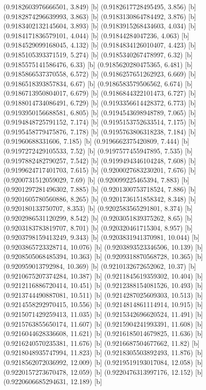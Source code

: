 {{{(0.9182603976666501, 3.849) [b] 
(0.9182617728495495, 3.856) [b] 
(0.9182874296639993, 3.863) [b] 
(0.9183130864784492, 3.876) [b] 
(0.9183402132145604, 3.893) [b] 
(0.9183915268434603, 4.034) [b] 
(0.9184171836579101, 4.044) [b] 
(0.91844284047236, 4.063) [b] 
(0.9184529099168045, 4.132) [b] 
(0.9184834126010407, 4.423) [b] 
(0.9185105393371519, 5.274) [b] 
(0.9185340267478997, 6.32) [b] 
(0.9185575141586476, 6.33) [b] 
(0.9185620280475365, 6.481) [b] 
(0.9185866537370558, 6.572) [b] 
(0.9186257651262923, 6.669) [b] 
(0.9186518393857834, 6.67) [b] 
(0.9186583579506562, 6.674) [b] 
(0.9186713950804017, 6.679) [b] 
(0.9186844322101473, 6.727) [b] 
(0.9188014734086491, 6.729) [b] 
(0.9193356614428372, 6.773) [b] 
(0.9193950156688581, 6.805) [b] 
(0.9194543698948789, 7.065) [b] 
(0.9194848725791152, 7.174) [b] 
(0.9195153752633514, 7.175) [b] 
(0.9195458779475876, 7.178) [b] 
(0.9195763806318238, 7.184) [b] 
(0.91960688331606, 7.185) [b] 
(0.9196662375420809, 7.444) [b] 
(0.9197272429105533, 7.52) [b] 
(0.9197577455947895, 7.535) [b] 
(0.9197882482790257, 7.542) [b] 
(0.9199494346104248, 7.608) [b] 
(0.9199624717401703, 7.615) [b] 
(0.9200027683230201, 7.676) [b] 
(0.9200731512059029, 7.69) [b] 
(0.920099225465394, 7.883) [b] 
(0.9201297281496302, 7.885) [b] 
(0.9201300753718524, 7.886) [b] 
(0.9201605780560886, 8.265) [b] 
(0.9201736151858342, 8.348) [b] 
(0.920180133750707, 8.353) [b] 
(0.9202583565291801, 8.374) [b] 
(0.9202986531120299, 8.542) [b] 
(0.9203051839375262, 8.65) [b] 
(0.9203183783819707, 8.701) [b] 
(0.920320461715304, 8.957) [b] 
(0.9203798159413249, 9.343) [b] 
(0.9203831941370981, 10.044) [b] 
(0.9203865723328714, 10.076) [b] 
(0.9203893523346506, 10.139) [b] 
(0.9208505068485394, 10.363) [b] 
(0.9209318870568728, 10.365) [b] 
(0.920959013792984, 10.369) [b] 
(0.9210132672652062, 10.37) [b] 
(0.9210675207374284, 10.387) [b] 
(0.9211845619359302, 10.404) [b] 
(0.9212116886720414, 10.451) [b] 
(0.9212388154081526, 10.493) [b] 
(0.9213744490887081, 10.511) [b] 
(0.9214287025609303, 10.513) [b] 
(0.9214558292970415, 10.556) [b] 
(0.9214814861114914, 10.915) [b] 
(0.9215071429259413, 11.035) [b] 
(0.9215342696620524, 11.491) [b] 
(0.9215763855650174, 11.607) [b] 
(0.9215904241993391, 11.608) [b] 
(0.9216044628336608, 11.621) [b] 
(0.9216185014679825, 11.636) [b] 
(0.9216240570235381, 11.676) [b] 
(0.9216687504677662, 11.82) [b] 
(0.9218048935747994, 11.823) [b] 
(0.9218305503892493, 11.876) [b] 
(0.9218562072036992, 12.009) [b] 
(0.9219519193017084, 12.058) [b] 
(0.9220157273670478, 12.059) [b] 
(0.9220476313997176, 12.152) [b] 
(0.9220606685294631, 12.189) [b] 
}}}
